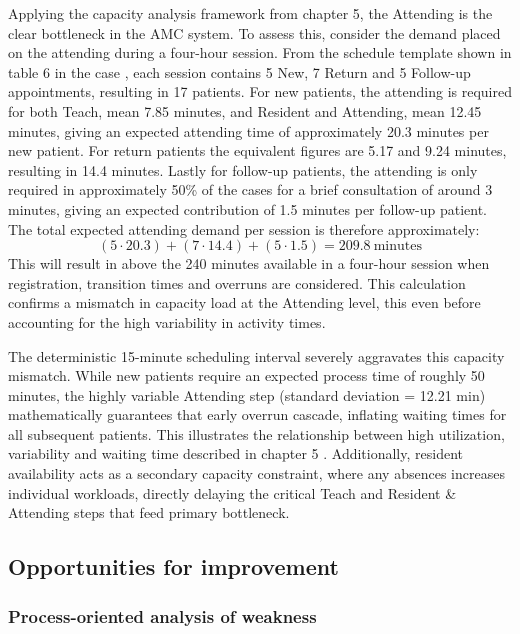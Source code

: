 Applying the capacity analysis framework from chapter 5, the Attending is the clear bottleneck in the AMC system. To assess this, consider the demand placed on the attending during a four-hour session. From the schedule template shown in table 6 in the case \parencite[Table 6]{MillerPainTreatmentCenter}, each session contains 5 New, 7 Return and 5 Follow-up appointments, resulting in 17 patients. For new patients, the attending is required for both Teach, mean 7.85 minutes, and Resident and Attending, mean 12.45 minutes, giving an expected attending time of approximately 20.3 minutes per new patient. For return patients the equivalent figures are 5.17 and 9.24 minutes, resulting in 14.4 minutes. Lastly for follow-up patients, the attending is only required in approximately 50\% of the cases for a brief consultation of around 3 minutes, giving an expected contribution of 1.5 minutes per follow-up patient. The total expected attending demand per session is therefore approximately:
\[(5 \cdot 20.3) + (7 \cdot 14.4) + (5 \cdot 1.5) = 209.8\ \text{minutes}\]
This will result in above the 240 minutes available in a four-hour session when registration, transition times and overruns are considered. This calculation confirms a mismatch in capacity load at the Attending level, this even before accounting for the high variability in activity times. 

The deterministic 15-minute scheduling interval severely aggravates this capacity mismatch. While new patients require an expected process time of roughly 50 minutes, the highly variable Attending step (standard deviation = 12.21 min) mathematically guarantees that early overrun cascade, inflating waiting times for all subsequent patients. This illustrates the relationship between high utilization, variability and waiting time described in chapter 5 \parencite[p. 168-169]{pensumbok}. Additionally, resident availability acts as a secondary capacity constraint, where any absences increases individual workloads, directly delaying the critical Teach and Resident \& Attending steps that feed primary bottleneck. 

\subsection{Opportunities for improvement}

\subsubsection{Process-oriented analysis of weakness}


